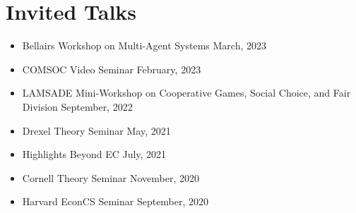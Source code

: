 \documentclass{article}
\begin{document}
    \section{Invited Talks}
    \begin{itemize}
    	\item Bellairs Workshop on Multi-Agent Systems \hfill March, 2023
    	\item COMSOC Video Seminar \hfill February, 2023
    \end{itemize}
    \begin{itemize}
    	\item LAMSADE Mini-Workshop on Cooperative Games, Social Choice, and Fair Division \hfill September, 2022
    \end{itemize}
    
    \begin{itemize}
    	\item Drexel Theory Seminar \hfill May, 2021
    \end{itemize}
    
    \begin{itemize}
    	\item Highlights Beyond EC \hfill July, 2021
    	\item Cornell Theory Seminar \hfill November, 2020
    	\item Harvard EconCS Seminar \hfill September, 2020
    \end{itemize}
    
    
\end{document}
